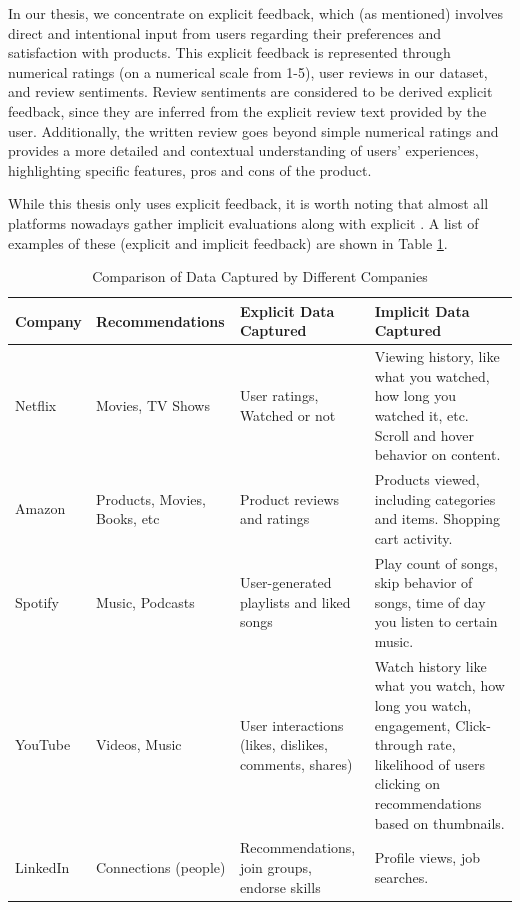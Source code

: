 In our thesis, we concentrate on explicit feedback, which (as mentioned) involves direct and intentional input from users regarding their preferences and satisfaction with products. This explicit feedback is represented through numerical ratings (on a numerical scale from 1-5), user reviews in our dataset, and review sentiments. Review sentiments are considered to be derived explicit feedback, since they are inferred from the explicit review text provided by the user\cite{chen2015recommender}. Additionally, the written review goes beyond simple numerical ratings and provides a more detailed and contextual understanding of users' experiences, highlighting specific features, pros and cons of the product. 

While this thesis only uses explicit feedback, it is worth noting that almost all platforms nowadays gather implicit evaluations along with explicit \cite{koren2009collaborative}. A list of examples of these (explicit and implicit feedback) are shown in Table \ref{tab:explicit_and_implicit_feedback}.

\begin{table}[h]
  \centering
  \begin{tabular}{|p{3cm}|p{3.5cm}|p{3.5cm}|p{5cm}|}
  \hline
  \textbf{Company} & \textbf{Recommendations} & \textbf{Explicit Data Captured} & \textbf{Implicit Data Captured} \\
  \hline
  Netflix & Movies, TV Shows & User ratings, Watched or not & Viewing history, like what you watched, how long you watched it, etc. Scroll and hover behavior on content. \\
  \hline
  Amazon & Products, Movies, Books, etc & Product reviews and ratings & Products viewed, including categories and items. Shopping cart activity. \\
  \hline
  Spotify & Music, Podcasts & User-generated playlists and liked songs & Play count of songs, skip behavior of songs, time of day you listen to certain music. \\
  \hline
  YouTube & Videos, Music & User interactions (likes, dislikes, comments, shares) & Watch history like what you watch, how long you watch, engagement, Click-through rate, likelihood of users clicking on recommendations based on thumbnails. \\
  \hline
  LinkedIn & Connections (people) & Recommendations, join groups, endorse skills & Profile views, job searches. \\
  \hline
  \end{tabular}
  \caption{Comparison of Data Captured by Different Companies}
  \label{tab:explicit_and_implicit_feedback}
  \end{table}
  
